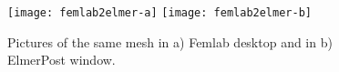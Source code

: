 
%
%

\begin{figure}[H]
\centering
\texttt{[image: femlab2elmer-a]}
\hspace{10mm}
\texttt{[image: femlab2elmer-b]}
\caption{Pictures of the same mesh in a) Femlab desktop and in b) ElmerPost window.}
\label{fg:pic-femlab}
\end{figure}


